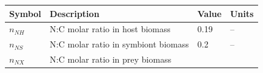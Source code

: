 \documentclass[]{elsarticle} %
\begin{document}
\begin{longtable}[c]{@{}llll@{}}
\toprule
\begin{minipage}[b]{0.10\columnwidth}\raggedright\strut
Symbol
\strut\end{minipage} &
\begin{minipage}[b]{0.48\columnwidth}\raggedright\strut
Description
\strut\end{minipage} &
\begin{minipage}[b]{0.09\columnwidth}\raggedright\strut
Value
\strut\end{minipage} &
\begin{minipage}[b]{0.23\columnwidth}\raggedright\strut
Units
\strut\end{minipage}\tabularnewline
\midrule
\endhead
\begin{minipage}[t]{0.10\columnwidth}\raggedright\strut
\(n_{NH}\)
\strut\end{minipage} &
\begin{minipage}[t]{0.48\columnwidth}\raggedright\strut
N:C molar ratio in host biomass
\strut\end{minipage} &
\begin{minipage}[t]{0.09\columnwidth}\raggedright\strut
0.19
\strut\end{minipage} &
\begin{minipage}[t]{0.23\columnwidth}\raggedright\strut
--
\strut\end{minipage}\tabularnewline
\begin{minipage}[t]{0.10\columnwidth}\raggedright\strut
\(n_{NS}\)
\strut\end{minipage} &
\begin{minipage}[t]{0.48\columnwidth}\raggedright\strut
N:C molar ratio in symbiont biomass
\strut\end{minipage} &
\begin{minipage}[t]{0.09\columnwidth}\raggedright\strut
0.2
\strut\end{minipage} &
\begin{minipage}[t]{0.23\columnwidth}\raggedright\strut
--
\strut\end{minipage}\tabularnewline
\begin{minipage}[t]{0.10\columnwidth}\raggedright\strut
\(n_{NX}\)
\strut\end{minipage} &
\begin{minipage}[t]{0.48\columnwidth}\raggedright\strut
N:C molar ratio in prey biomass
\strut\end{minipage} &
\begin{minipage}[t]{0.09\columnwidth}\raggedright\strut

\end{minipage}
\end{longtable}
\end{document}

